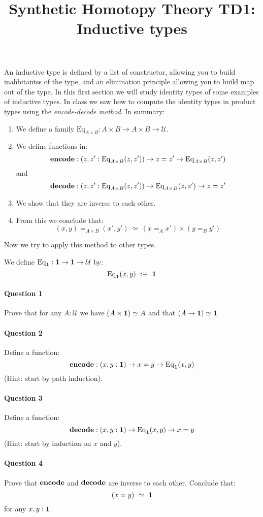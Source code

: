 \documentclass{article}[6pt]%
\title{Synthetic Homotopy Theory TD1: Inductive types}
\newcommand{\se}[1]{\medbreak \medbreak \section{#1}}
\newcommand{\sse}[1]{\medbreak \subsection{#1}}
\newcommand{\U}{{\mathcal U}}
\renewcommand{\r}{\rightarrow}
\newcommand{\one}{{\bf 1}}
\newcommand{\zero}{{\bf 0}}
\newcommand{\Eq}{\mathrm{Eq}}
\newcommand{\encode}{\mathrm{\bf encode}}
\newcommand{\decode}{\mathrm{\bf decode}}
\begin{document}
\maketitle



An inductive type is defined by a list of constructor, allowing you to build inahbitantss of the type, and an elimination principle allowing you to build map out of the type. In this first section we will study identity types of some examples of inductive types. In class we saw how to compute the identity types in product types using the \emph{encode-decode method}. In summary:

\begin{enumerate}
\item We define a family $\Eq_{A\times B} : A\times B \r A\times B \r \U$.
\item We define functions in:
\[\encode : (z,z':\Eq_{A\times B}(z,z')) \r z=z'\r \Eq_{A\times B}(z,z')\]
and
\[\decode : (z,z':\Eq_{A\times B}(z,z')) \r \Eq_{A\times B}(z,z') \r z=z'\]
\item We show that they are inverse to each other.
\item From this we conclude that:
\[(x,y)=_{A\times B}(x',y') \ \simeq \ (x=_Ax')\times (y=_By')\]
\end{enumerate}

Now we try to apply this method to other types.




\begin{Exercise}[title={The unit type}]

We define $\Eq_\one : \one \r \one \r \U$ by:
\[\Eq_\one(x,y) \ :\equiv\ \one\]

\paragraph{Question 1} Prove that for any $A:\U$ we have $(A\times \one) \simeq A$ and that $(A\r\one)\simeq\one$

\paragraph{Question 2} Define a function:
\[\encode : (x,y:\one) \r x=y \r \Eq_\one(x,y)\]
(Hint: start by path induction).

\paragraph{Question 3} Define a function:
\[\decode : (x,y:\one) \r \Eq_\one(x,y)\r x=y\]
(Hint: start by induction on $x$ and $y$).

\paragraph{Question 4} Prove that $\encode$ and $\decode$ are inverse to each other. Conclude that:
\[(x=y) \ \simeq \ \one\]
for any $x,y:\one$.
\end{Exercise}
\end{document}
